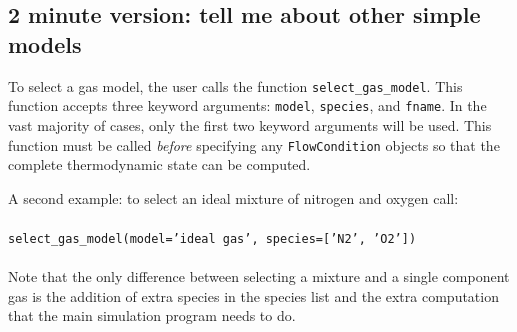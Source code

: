 \subsection{2 minute version: tell me about other simple models}

To select a gas model, the user calls the function
\texttt{select\_gas\_model}.
This function accepts three keyword arguments: \texttt{model},
\texttt{species}, and \texttt{fname}.
In the vast majority of cases, only the first
two keyword arguments will be used.
This function must be called \emph{before} specifying any \texttt{FlowCondition} objects
so that the complete thermodynamic state can be computed.

\medskip
A second example: to select an ideal mixture of nitrogen and oxygen
call:\\
%
\topbar\\
\texttt{select\_gas\_model(model='ideal gas', species=['N2', 'O2'])}\\
\bottombar\\
%
Note that the only difference between selecting a mixture and a single
component gas is the addition of extra species in the species list and the extra computation that
the main simulation program needs to do.

